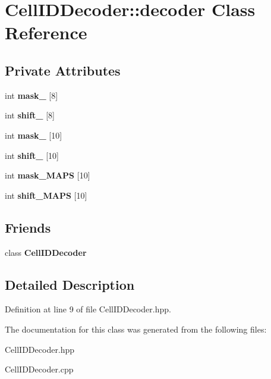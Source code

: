 \section{Cell\-I\-D\-Decoder\-:\-:decoder Class Reference}
\label{classCellIDDecoder_1_1decoder}
\subsection*{Private Attributes}
\begin{DoxyCompactItemize}
\item 
int {\bfseries mask\-\_} [8]\label{classCellIDDecoder_1_1decoder_a42b09663e93c2f46fa72e2b2de6edd6b}

\item 
int {\bfseries shift\-\_} [8]\label{classCellIDDecoder_1_1decoder_a14beea35350f8107e69634dbb32fc920}

\item 
int {\bfseries mask\-\_} [10]\label{classCellIDDecoder_1_1decoder_a80ae287b494692d309632d6d718f5589}

\item 
int {\bfseries shift\-\_} [10]\label{classCellIDDecoder_1_1decoder_a3ef5bc7c99e94f2d2c5b9b1cfbb99cc7}

\item 
int {\bfseries mask\-\_\-\-M\-A\-P\-S} [10]\label{classCellIDDecoder_1_1decoder_ae5fefd9a154215933e4fcd84a385ded8}

\item 
int {\bfseries shift\-\_\-\-M\-A\-P\-S} [10]\label{classCellIDDecoder_1_1decoder_a845f3872403b52830025328137b06c47}

\end{DoxyCompactItemize}
\subsection*{Friends}
\begin{DoxyCompactItemize}
\item 
class {\bfseries Cell\-I\-D\-Decoder}\label{classCellIDDecoder_1_1decoder_a9449cccf7753cfe2c5b4383443c25c59}

\end{DoxyCompactItemize}


\subsection{Detailed Description}


Definition at line 9 of file Cell\-I\-D\-Decoder.\-hpp.



The documentation for this class was generated from the following files\-:\begin{DoxyCompactItemize}
\item 
Cell\-I\-D\-Decoder.\-hpp\item 
Cell\-I\-D\-Decoder.\-cpp\end{DoxyCompactItemize}
